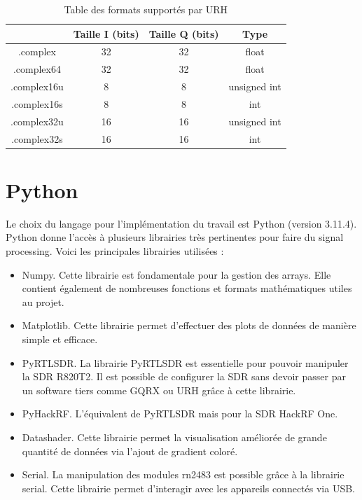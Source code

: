 \begin{table}[h]
\centering
\begin{tabular}{|c|c|c|c|}
\hline
\multicolumn{1}{|c|}{} & \multicolumn{1}{c|}{Taille I (bits)} &\multicolumn{1}{c|}{Taille Q (bits)} & \multicolumn{1}{c|}{Type}\\
\hline
.complex & 32 & 32 & float \\
\hline
.complex64 & 32 & 32 & float\\
\hline
.complex16u & 8 & 8 & unsigned int\\
\hline
.complex16s &  8 & 8 & int\\
\hline
.complex32u & 16 & 16 & unsigned int \\
\hline
.complex32s & 16 & 16 & int  \\
\hline
\end{tabular}
\caption{Table des formats supportés par URH}
\label{format}
\end{table}



\section{Python}

Le choix du langage pour l'implémentation du travail est Python (version 3.11.4). Python donne l'accès à plusieurs librairies très pertinentes pour faire du signal processing. Voici les principales librairies utilisées :

\vspace{0.1cm}

\begin{itemize}
\item Numpy. Cette librairie est fondamentale pour la gestion des arrays. Elle contient également de nombreuses fonctions et formats mathématiques utiles au projet.
\item Matplotlib. Cette librairie permet d'effectuer des plots de données de manière simple et efficace.
\item PyRTLSDR. La librairie PyRTLSDR est essentielle pour pouvoir manipuler la \ac{SDR} R820T2. Il est possible de configurer la \ac{SDR} sans devoir passer par un software tiers comme GQRX ou \ac{URH} grâce à cette librairie.
\item PyHackRF. L'équivalent de PyRTLSDR mais pour la \ac{SDR} HackRF One.
\item Datashader. Cette librairie permet la visualisation améliorée de grande quantité de données via l'ajout de gradient coloré.
\item Serial. La manipulation des modules rn2483 est possible grâce à la librairie serial. Cette librairie permet d'interagir avec les appareils connectés via USB.
\end{itemize}

